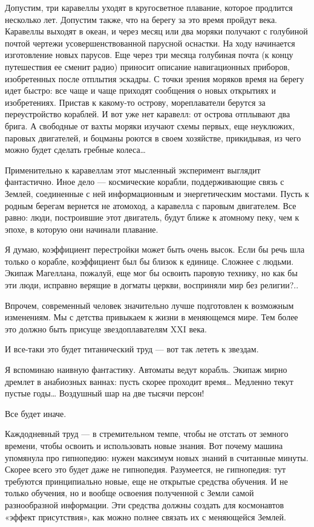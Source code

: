   Допустим, три каравеллы уходят в кругосветное плавание, которое  продлится
   несколько лет. Допустим также,  что на берегу за  это время пройдут  века.
   Каравеллы выходят  в  океан, и  через  месяц  или два  моряки  получают  с
   голубиной почтой чертежи  усовершенствованной парусной  оснастки. На  ходу
   начинается изготовление  новых парусов.  Еще  через три  месяца  голубиная
   почта  (к   концу  путешествия   ее   сменит  радио)   приносит   описание
   навигационных приборов,  изобретенных  после  отплытия  эскадры.  С  точки
   зрения моряков  время на  берегу идет  быстро: все  чаще и  чаще  приходят
   сообщения о новых открытиях и  изобретениях. Пристав к какому-то  острову,
   мореплаватели берутся за переустройство кораблей. И вот уже нет  каравелл:
   от острова отплывают два брига. А свободные от вахты моряки изучают  схемы
   первых, еще  неуклюжих,  паровых  двигателей, и  боцманы  роются  в  своем
   хозяйстве, прикидывая, из чего можно будет сделать гребные колеса…

   Применительно   к   каравеллам   этот   мысленный   эксперимент   выглядит
   фантастично. Иное  дело  —  космические корабли,  поддерживающие  связь  с
   Землей, соединенные с ней информационным и энергетическим мостами. Пусть к
   родным берегам вернется не атомоход, а каравелла с паровым двигателем. Все
   равно: люди, построившие этот двигатель, будут ближе к атомному пеку,  чем
   к эпохе, в которую они начинали плавание.

   Я думаю, коэффициент перестройки может быть очень высок. Если бы речь  шла
   только о корабле, коэффициент был бы  близок к единице. Сложнее с  людьми.
   Экипаж Магеллана, пожалуй, еще мог бы  освоить паровую технику, но как  бы
   эти люди, исправно верящие в догматы церкви, восприняли мир без религии?..

   Впрочем, современный  человек значительно  лучше подготовлен  к  возможным
   изменениям. Мы с детства  привыкаем к жизни в  меняющемся мире. Тем  более
   это должно быть присуще звездоплавателям XXI века.

   И все-таки это будет титанический труд — вот так лететь к звездам.

   Я вспоминаю  наивную  фантастику.  Автоматы ведут  корабль.  Экипаж  мирно
   дремлет в анабиозных ваннах: пусть  скорее проходит время… Медленно  текут
   пустые годы… Воздушный шар на две тысячи персон!

   Все будет иначе.

   Каждодневный труд —  в стремительном  темпе, чтобы не  отстать от  земного
   времени, чтобы  освоить и  использовать новые  знания. Вот  почему  машина
   упомянула про гипнопедию: нужен максимум новых знаний в считанные  минуты.
   Скорее всего это будет даже не гипнопедия. Разумеется, не гипнопедия:  тут
   требуются принципиально новые,  еще не  открытые средства  обучения. И  не
   только  обучения,  но   и  вообще  освоения   полученной  с  Земли   самой
   разнообразной информации.  Эти  средства должны  создать  для  космонавтов
   «эффект присутствия», как можно полнее связать их с меняющейся Землей.

